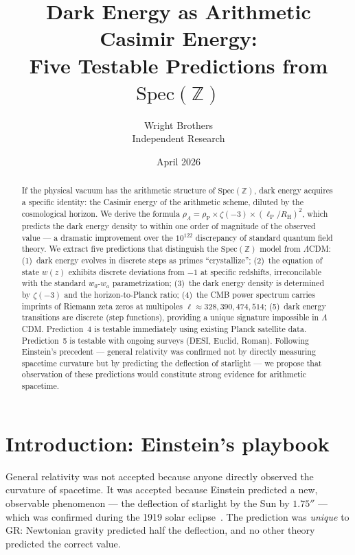 \documentclass[11pt,a4paper]{article}
\newcommand{\Spec}{\mathrm{Spec}}
\newcommand{\lP}{\ell_{\mathrm{P}}}
\newcommand{\RH}{R_{\mathrm{H}}}
\newcommand{\rhoP}{\rho_{\mathrm{P}}}
\begin{document}
\title{Dark Energy as Arithmetic Casimir Energy:\\
  Five Testable Predictions from $\Spec(\mathbb{Z})$}

\author{Wright Brothers\\{\small Independent Research}}
\date{April 2026}
\maketitle

\begin{abstract}
If the physical vacuum has the arithmetic structure of
$\Spec(\mathbb{Z})$, dark energy acquires a specific identity:
the Casimir energy of the arithmetic scheme, diluted by the
cosmological horizon. We derive the formula
$\rho_\Lambda = \rhoP \times \zeta(-3) \times (\lP/\RH)^2$,
which predicts the dark energy density to within one order of
magnitude of the observed value --- a dramatic improvement over
the $10^{122}$ discrepancy of standard quantum field theory.
We extract five predictions that distinguish the $\Spec(\mathbb{Z})$
model from $\Lambda$CDM:
(1)~dark energy evolves in discrete steps as primes ``crystallize'';
(2)~the equation of state $w(z)$ exhibits discrete deviations from
$-1$ at specific redshifts, irreconcilable with the standard
$w_0$-$w_a$ parametrization;
(3)~the dark energy density is determined by $\zeta(-3)$ and the
horizon-to-Planck ratio;
(4)~the CMB power spectrum carries imprints of Riemann zeta zeros
at multipoles $\ell \approx 328, 390, 474, 514$;
(5)~dark energy transitions are discrete (step functions), providing
a unique signature impossible in $\Lambda$CDM.
Prediction~4 is testable immediately using existing Planck satellite
data. Prediction~5 is testable with ongoing surveys (DESI, Euclid, Roman).
Following Einstein's precedent --- general relativity was confirmed not
by directly measuring spacetime curvature but by predicting the
deflection of starlight --- we propose that observation of these
predictions would constitute strong evidence for arithmetic spacetime.
\end{abstract}

\section{Introduction: Einstein's playbook}

General relativity was not accepted because anyone directly observed
the curvature of spacetime. It was accepted because Einstein predicted
a new, observable phenomenon --- the deflection of starlight by the
Sun by $1.75''$ --- which was confirmed during the 1919 solar
eclipse~\cite{Dyson1920}. The prediction was \emph{unique} to GR:
Newtonian gravity predicted half the deflection, and no other theory
predicted the correct value.
\end{document}
